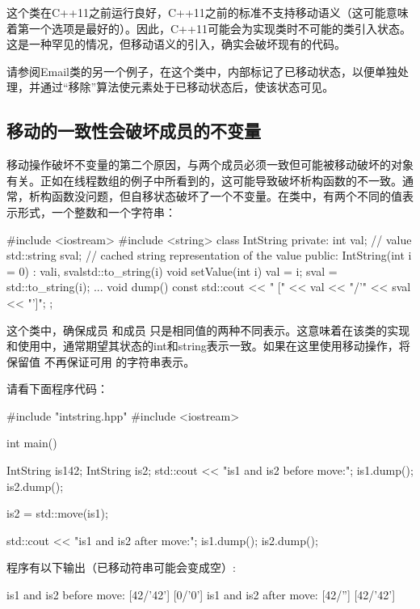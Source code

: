 这个类在C++11之前运行良好，C++11之前的标准不支持移动语义（这可能意味着第一个选项是最好的）。因此，C++11可能会为实现类时不可能的类引入状态。这是一种罕见的情况，但移动语义的引入，确实会破坏现有的代码。

请参阅Email类的另一个例子，在这个类中，内部标记了已移动状态，以便单独处理，并通过“移除”算法使元素处于已移动状态后，使该状态可见。

\subsection{移动的一致性会破坏成员的不变量}

移动操作破坏不变量的第二个原因，与两个成员必须一致但可能被移动破坏的对象有关。正如在线程数组的例子中所看到的，这可能导致破坏析构函数的不一致。通常，析构函数没问题，但自移状态破坏了一个不变量。在类中，有两个不同的值表示形式，一个整数和一个字符串：

\begin{cppcode}
#include <iostream>
#include <string>
class IntString
{
	private:
	int val; // value
	std::string sval; // cached string representation of the value
	public:
	IntString(int i = 0)
	: val{i}, sval{std::to_string(i)} {
	}
	void setValue(int i) {
		val = i;
		sval = std::to_string(i);
	}
	...
	void dump() const {
		std::cout << " [" << val << "/'" << sval << "']\n";
	}
};
\end{cppcode}

这个类中，确保成员  和成员  只是相同值的两种不同表示。这意味着在该类的实现和使用中，通常期望其状态的int和string表示一致。如果在这里使用移动操作，将保留值  不再保证可用  的字符串表示。

请看下面程序代码：

\begin{cppcode}
#include "intstring.hpp"
#include <iostream>

int main()
{
	IntString is1{42};
	IntString is2;
	std::cout << "is1 and is2 before move:\n";
	is1.dump();
	is2.dump();

	is2 = std::move(is1);

	std::cout << "is1 and is2 after move:\n";
	is1.dump();
	is2.dump();
}
\end{cppcode}

程序有以下输出（已移动符串可能会变成空）:

\begin{outputcode}
is1 and is2 before move:
 [42/'42']
 [0/'0']
is1 and is2 after move:
 [42/'']
 [42/'42']
\end{outputcode}

